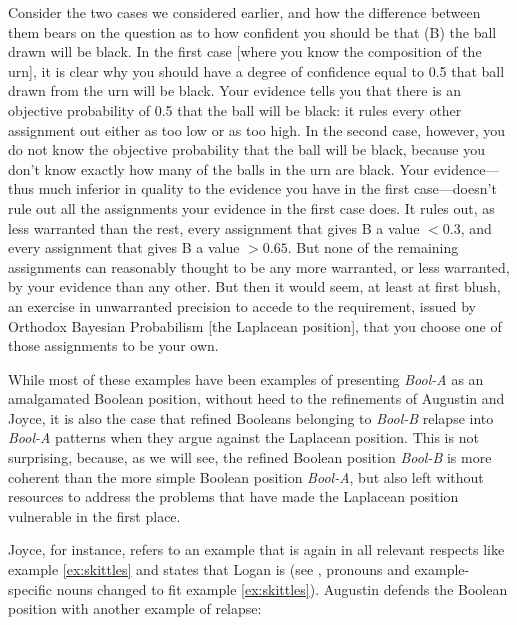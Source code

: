 \documentclass[11pt]{article}
\newcommand{\anderson}[0]{\textit{Bool-A}}
\newcommand{\augustin}[0]{\textit{Bool-B}}
\begin{document}
\begin{quotex}
  Consider the two cases we considered earlier, and how the difference
  between them bears on the question as to how confident you should be
  that (B) the ball drawn will be black. In the first case [where you
  know the composition of the urn], it is clear why you should have a
  degree of confidence equal to 0.5 that ball drawn from the urn will
  be black. Your evidence tells you that there is an objective
  probability of 0.5 that the ball will be black: it rules every other
  assignment out either as too low or as too high. In the second case,
  however, you do not know the objective probability that the ball
  will be black, because you don't know exactly how many of the balls
  in the urn are black. Your evidence---thus much inferior in quality
  to the evidence you have in the first case---doesn't rule out all
  the assignments your evidence in the first case does. It rules out,
  as less warranted than the rest, every assignment that gives B a
  value $<0.3$, and every assignment that gives B a value $>0.65$. But
  none of the remaining assignments can reasonably thought to be any
  more warranted, or less warranted, by your evidence than any other.
  But then it would seem, at least at first blush, an exercise in
  unwarranted precision to accede to the requirement, issued by
  Orthodox Bayesian Probabilism [the Laplacean position], that you
  choose one of those assignments to be your own.
\end{quotex}

While most of these examples have been examples of presenting
{\anderson} as an amalgamated Boolean position, without heed to the
refinements of Augustin and Joyce, it is also the case that refined
Booleans belonging to {\augustin} relapse into {\anderson} patterns
when they argue against the Laplacean position. This is not
surprising, because, as we will see, the refined Boolean position
{\augustin} is more coherent than the more simple Boolean position
{\anderson}, but also left without resources to address the problems
that have made the Laplacean position vulnerable in the first place.

Joyce, for instance, refers to an example that is again in all
relevant respects like example \ref{ex:skittles} and states that Logan
is  (see ,
pronouns and example-specific nouns changed to fit example
\ref{ex:skittles}). Augustin defends the Boolean position with another
example of relapse:
\end{document}

